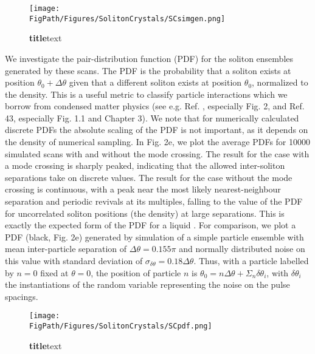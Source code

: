 \begin{figure}[htpb]
	\begin{center}
		\texttt{[image: \\FigPath/Figures/SolitonCrystals/SCsimgen.png]}
	\end{center}
	\caption[Figure Title]{\textbf{title}text}
	\label{fig:SCsimgen}
\end{figure} 

We investigate the pair-distribution function (PDF) for the soliton ensembles generated by these scans. The PDF is the probability that a soliton exists at position $\theta_0+\Delta\theta$ given that a different soliton exists at position $\theta_0$, normalized to the density. This is a useful metric to classify particle interactions which we borrow from condensed matter physics (see e.g. Ref. \cite{42}, especially Fig. 2, and Ref. 43, especially Fig. 1.1 and Chapter 3). We note that for numerically calculated discrete PDFs the absolute scaling of the PDF is not important, as it depends on the density of numerical sampling. In Fig. 2e, we plot the average PDFs for 10000 simulated scans with and without the mode crossing. The result for the case with a mode crossing is sharply peaked, indicating that the allowed inter-soliton separations take on discrete values. The result for the case without the mode crossing is continuous, with a peak near the most likely nearest-neighbour separation and periodic revivals at its multiples, falling to the value of the PDF for uncorrelated soliton positions (the density) at large separations. This is exactly the expected form of the PDF for a liquid \cite{42,43}. For comparison, we plot a PDF (black, Fig. 2e) generated by simulation of a simple particle ensemble with mean inter-particle separation of $\Delta\theta=0.155\pi$ and normally distributed noise on this value with standard deviation of $\sigma_{\delta\theta}=0.18\Delta\theta$. Thus, with a particle labelled by $n = 0$ fixed at $\theta = 0$, the position of particle $n$ is $\theta_0 = n\Delta\theta + \Sigma_n\delta\theta_i$, with $\delta\theta_i$ the instantiations of the random variable representing the noise on the pulse spacings. 

\begin{figure}[htpb]
	\begin{center}
		\texttt{[image: \\FigPath/Figures/SolitonCrystals/SCpdf.png]}
	\end{center}
	\caption[Figure Title]{\textbf{title}text}
	\label{fig:SCpdf}
\end{figure} 


